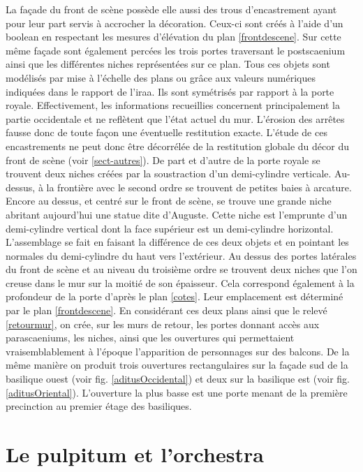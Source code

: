 La façade du front de scène possède elle aussi des trous d'encastrement ayant pour leur part servis à accrocher la décoration. Ceux-ci sont créés à l'aide d'un \gls{boolean} en respectant les mesures d'élévation du plan \ref{frontdescene}. Sur cette même façade sont également percées les trois portes traversant le \gls{postscaenium} ainsi que les différentes niches représentées sur ce plan. Tous ces objets sont modélisés par mise à l'échelle des plans \cite{orangePl} ou grâce aux valeurs numériques indiquées dans le rapport de l'\gls{iraa}\cite[Chap. II]{orangeTxt}. Ils sont symétrisés par rapport à la porte royale. Effectivement, les informations recueillies concernent principalement la partie occidentale et ne reflètent que l'état actuel du mur. L'érosion des arrêtes fausse donc de toute façon une éventuelle restitution exacte. L'étude de ces encastrements ne peut donc être décorrélée de la restitution globale du décor du front de scène (voir \ref{sect-autres}). De part et d'autre de la porte royale se trouvent deux niches créées par la soustraction d'un demi-cylindre verticale. Au-dessus, à la frontière avec le second ordre se trouvent de petites baies à arcature. Encore au dessus, et centré sur le front de scène, se trouve une grande niche abritant aujourd'hui une statue dite d'Auguste. Cette niche est l'emprunte d'un demi-cylindre vertical dont la face supérieur est un demi-cylindre horizontal. L'assemblage se fait en faisant la différence de ces deux objets et en pointant les normales du demi-cylindre du haut vers l'extérieur. Au dessus des portes latérales du front de scène et au niveau du troisième ordre se trouvent deux niches que l'on creuse dans le mur sur la moitié de son épaisseur. Cela correspond également à la profondeur de la porte d'après le plan \ref{cotes}. Leur emplacement est déterminé par le plan \ref{frontdescene}. En considérant ces deux plans ainsi que le relevé \ref{retourmur}, on crée, sur les murs de retour, les portes donnant accès aux \glspl{parascaenium}, les niches, ainsi que les ouvertures qui permettaient vraisemblablement à l'époque l'apparition de personnages sur des balcons. De la même manière on produit trois ouvertures rectangulaires sur la façade sud de la \gls{basilique} ouest (voir fig. \ref{aditusOccidental}) et deux sur la \gls{basilique} est (voir fig. \ref{aditusOriental}). L'ouverture la plus basse est une porte menant de la première \gls{precinction} au premier étage des \glspl{basilique}.


\section{Le \gls{pulpitum} et l'\gls{orchestra}} 

